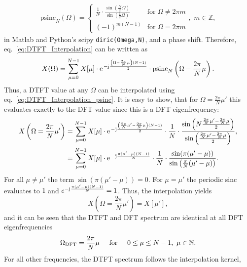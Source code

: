 \documentclass[11pt,a4paper,DIV=12]{scrartcl}
\begin{document}
%
\begin{align}
\text{psinc}_N(\Omega)=\begin{cases}\frac{1}{N}\cdot\frac{\sin\left(\frac{N}{2}\Omega\right)}{\sin\left(\frac{1}{2}\Omega\right)}&\text{for }\Omega\neq2\pi m\\
(-1)^{m(N-1)}&\text{for }\Omega=2\pi m\end{cases},\,\,m\in\mathbb{Z},
\label{eq:periodic_sinc}
\end{align}
%
in Matlab and Python's scipy \texttt{diric(Omega,N)}, and a phase shift.
%
Therefore, eq.~\eqref{eq:DTFT_Interpolation} can be written as
%
\begin{equation}
X(\Omega)=\sum_{\mu=0}^{N-1}X[\mu]\cdot\e^{-\im\frac{\left(\Omega-\frac{2\pi}{N}\mu\right)(N-1)}{2}}\cdot\text{psinc}_N\left(\Omega-\frac{2\pi}{N}\mu\right).
\label{eq:DTFT_Interpolation_psinc}
\end{equation}
%
Thus, a DTFT value at any $\Omega$ can be interpolated using
eq.~\eqref{eq:DTFT_Interpolation_psinc}.
%
It is easy to show, that for $\Omega=\frac{2\pi}{N}\mu'$ this evaluates exactly
to the DFT value since this is a DFT eigenfrequency:
\begin{align}
X\left(\Omega=\frac{2\pi}{N}\mu'\right)&=\sum_{\mu=0}^{N-1}X[\mu]\cdot\e^{-\im\frac{\left(\frac{2\pi}{N}\mu'-\frac{2\pi}{N}\mu\right)(N-1)}{2}}\cdot\frac{1}{N}\cdot\frac{\sin\left(N\frac{\frac{2\pi}{N}\mu'-\frac{2\pi}{N}\mu}{2}\right)}{\sin\left(\frac{\frac{2\pi}{N}\mu'-\frac{2\pi}{N}\mu}{2}\right)},\\
&=\sum_{\mu=0}^{N-1}X[\mu]\cdot\e^{-\im\frac{\pi(\mu'-\mu)(N-1)}{N}}\cdot\frac{1}{N}\cdot\frac{\sin(\pi(\mu'-\mu))}{\sin\left(\frac{\pi}{N}(\mu'-\mu)\right)}.
\end{align}
%
For all $\mu\neq\mu'$ the term $\sin(\pi(\mu'-\mu))=0$.
%
For $\mu=\mu'$ the periodic sinc evaluates to $1$ and
$e^{-\im\frac{\pi(\mu'-\mu)(N-1)}{N}}=1$.
%
Thus, the interpolation yields
\begin{equation}
X\left(\Omega=\frac{2\pi}{N}\mu'\right)=X[\mu'],
\end{equation}
and it can be seen that the DTFT and DFT spectrum are identical at all DFT
eigenfrequencies
%
\begin{equation}
\Omega_\text{DFT}=\frac{2\pi}{N}\mu \hspace{5mm}\text{for}\hspace{5mm} 0\leq\mu\leq N-1,\,\,\mu\in\mathbb{N}.
\end{equation}
%
For all other frequencies, the DTFT spectrum follows the interpolation kernel,
\end{document}
